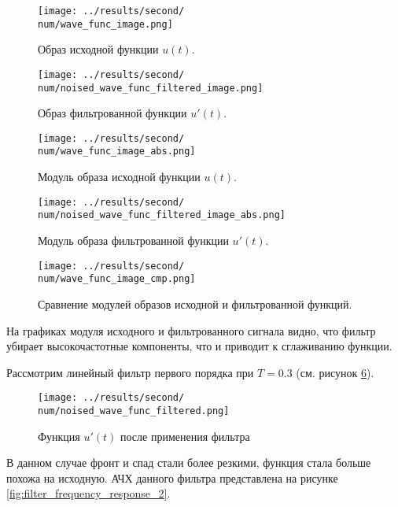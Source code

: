 \begin{figure}[ht!]
    \centering
    \texttt{[image: ../results/second/\\num/wave\_func\_image.png]}
    \caption{Образ исходной функции $u(t)$.}
    \label{fig:wave_func_image_\num}
\end{figure}

\begin{figure}[ht!]
    \centering
    \texttt{[image: ../results/second/\\num/noised\_wave\_func\_filtered\_image.png]}
    \caption{Образ фильтрованной функции $u'(t)$.}
    \label{fig:noised_wave_func_filtered_image_\num}
\end{figure}

\begin{figure}[ht!]
    \centering
    \texttt{[image: ../results/second/\\num/wave\_func\_image\_abs.png]}
    \caption{Модуль образа исходной функции $u(t)$.}
    \label{fig:wave_func_image_abs_\num}
\end{figure}

\begin{figure}[ht!]
    \centering
    \texttt{[image: ../results/second/\\num/noised\_wave\_func\_filtered\_image\_abs.png]}
    \caption{Модуль образа фильтрованной функции $u'(t)$.}
    \label{fig:noised_wave_func_filtered_image_abs_\num}
\end{figure}

\begin{figure}[ht!]
    \centering
    \texttt{[image: ../results/second/\\num/wave\_func\_image\_cmp.png]}
    \caption{Сравнение модулей образов исходной и фильтрованной функций.}
    \label{fig:wave_func_image_cmp_\num}
\end{figure}

На графиках модуля исходного и фильтрованного сигнала видно, что фильтр убирает высокочастотные компоненты, что и приводит к сглаживанию функции.

\FloatBarrier
\def\num{2}
\def\T{0.3}
Рассмотрим линейный фильтр первого порядка при $T = \T$ (см. рисунок \ref{fig:noised_wave_func_filtered_\num}).

\begin{figure}[ht!]
    \centering
    \texttt{[image: ../results/second/\\num/noised\_wave\_func\_filtered.png]}
    \caption{Функция $u'(t)$ после применения фильтра}
    \label{fig:noised_wave_func_filtered_\num}
\end{figure}
В данном случае фронт и спад стали более резкими, функция стала больше похожа на исходную. 
АЧХ данного фильтра представлена на рисунке \ref{fig:filter_frequency_response_\num}.

